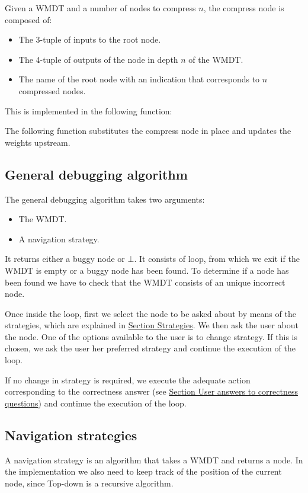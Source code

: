 Given a WMDT and a number of nodes to compress \(n\), the compress node is composed of:
\begin{itemize}
    \item The 3-tuple of inputs to the root node.
    \item The 4-tuple of outputs of the node in depth \(n\) of the WMDT.
    \item The name of the root node with an indication that corresponds to \(n\) compressed nodes.
\end{itemize}
This is implemented in the following function:

The following function substitutes the compress node in place and updates the weights upstream.

\subsection{General debugging algorithm}
The general debugging algorithm takes two arguments:
\begin{itemize}
    \item The WMDT.
    \item A navigation strategy.
\end{itemize}
It returns either a buggy node or \(\bot\).
It consists of loop, from which we exit if the WMDT is empty or a buggy node has been found.
To determine if a node has been found we have to check that the WMDT consists of an unique incorrect node.

Once inside the loop, first we select the node to be asked about by means of the strategies, which are explained in \hyperref[implementation:Strategies]{Section Strategies}.
We then ask the user about the node. One of the options available to the user is to change strategy. If this is chosen, we ask the user her preferred strategy and continue the execution of the loop.

If no change in strategy is required, we execute the adequate action corresponding to the correctness answer (see \hyperref[implementation:correctnessAnswers]{Section User answers to correctness questions}) and continue the execution of the loop.

\subsection{Navigation strategies}
\label{implementation:Strategies}
A navigation strategy is an algorithm that takes a WMDT and returns a node.
In the implementation we also need to keep track of the position of the current node, since Top-down is a recursive algorithm.

